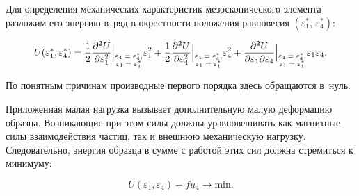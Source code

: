 
Для определения механических характеристик мезоскопического элемента разложим его энергию в~ряд в окрестности положения равновесия $(\varepsilon_1^*,\,\varepsilon_4^*)$:

\begin{gather}

\label{eq:U_series_1}

U(\varepsilon_1^*,\varepsilon_4^*)=\frac{1}{2}

\frac{\partial^2 U}{\partial \varepsilon_1^2}\Bigl|_{\scriptsize\begin{matrix}\scriptsize \varepsilon_4=\varepsilon_4^*, \\ \scriptsize\varepsilon_1=\varepsilon^*_1\end{matrix}}\varepsilon_1^2 +

\frac{1}{2}

\frac{\partial^2 U}{\partial \varepsilon_4^2}\Bigl|_{\scriptsize\begin{matrix} \varepsilon_4=\varepsilon_4^*, \\ \varepsilon_1=\varepsilon^*_1\end{matrix}}\varepsilon_4^2 +

\frac{\partial^2 U}{\partial \varepsilon_1 \partial \varepsilon_4}\Bigl|_{\scriptsize\begin{matrix} \varepsilon_4=\varepsilon_4^*, \\ \varepsilon_1=\varepsilon^*_1\end{matrix}}\varepsilon_1 \varepsilon_4.

\end{gather}

По понятным причинам производные первого порядка здесь обращаются \linebreak в~нуль.



Приложенная малая нагрузка вызывает дополнительную малую деформацию образца. Возникающие при этом силы должны уравновешивать как магнитные силы взаимодействия частиц, так и внешнюю механическую нагрузку. Следовательно, энергия образца в сумме с работой этих сил должна стремиться к минимуму:

\begin{equation}

\label{eq:OP}%

U(\varepsilon_1,\varepsilon_4) - fu_4 \to \text{min}.

\end{equation}

